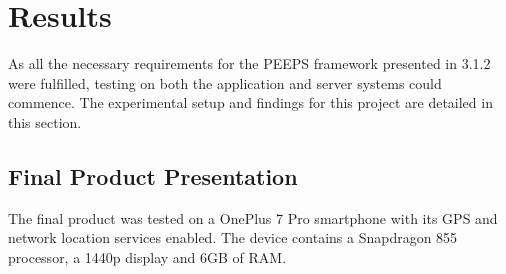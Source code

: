 \chapter{Results}
As all the necessary requirements for the PEEPS framework presented in 3.1.2 were fulfilled, testing on both the application and server systems could commence. The experimental setup and findings for this project are detailed in this section.


\section{Final Product Presentation}
The final product was tested on a OnePlus 7 Pro smartphone with its GPS and network location services enabled. The device contains a Snapdragon 855 processor, a 1440p display and 6GB of RAM.

